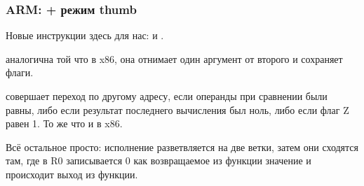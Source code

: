\subsubsection{ARM: \OptimizingKeil + режим thumb}



Новые инструкции здесь для нас: \CMP и .

\CMP аналогична той что в x86, она отнимает один аргумент от второго и сохраняет флаги.

 совершает переход по другому адресу, если операнды при сравнении были равны, либо если результат 
последнего вычисления был ноль, либо если флаг Z равен 1. То же что и \JZ в x86.

Всё остальное просто: исполнение разветвляется на две ветки, затем они сходятся там, где в R0 записывается 0
как возвращаемое из функции значение и происходит выход из функции.


